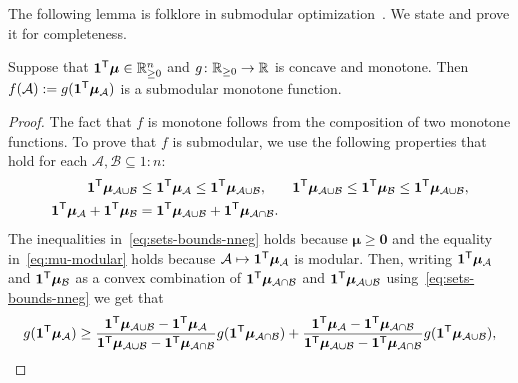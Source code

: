 \documentclass[10pt]{article} %
\renewcommand{\cite}{\citep}
\begin{document}
The following lemma is folklore in submodular optimization~\cite[theorem~4.5.1]{Bilmes18}. We state and prove it for completeness.
\begin{lemma} \label{lem:submodular-concave}
  Suppose that $\bm{1}^{\mathsf{T}}\bm{\mu}\in \mathbb{R}^n_{\ge 0}$ and $g \colon \mathbb{R}_{\ge 0} \to \mathbb{R}$ is concave and monotone. Then $f(\mathcal{A}) := g(\bm{1}^{\mathsf{T}}\bm{\mu}_{\mathcal{A}})$ is a submodular monotone function.
\end{lemma}
\begin{proof}
  The fact that $f$ is monotone follows from the composition of two monotone functions. To prove that $f$ is submodular, we use the following properties that hold for each $\mathcal{A}, \mathcal{B} \subseteq 1{:}n$:
  \begin{align}
    \label{eq:sets-bounds-nneg}
    \bm{1}^{\mathsf{T}}\bm{\mu}_{\mathcal{A} \cup \mathcal{B}}
    &\le \bm{1}^{\mathsf{T}}\bm{\mu}_{\mathcal{A}} \le \bm{1}^{\mathsf{T}}\bm{\mu}_{\mathcal{A} \cup \mathcal{B}},
    &
    \bm{1}^{\mathsf{T}}\bm{\mu}_{\mathcal{A} \cup \mathcal{B}}
    &\le \bm{1}^{\mathsf{T}}\bm{\mu}_{\mathcal{B}} \le \bm{1}^{\mathsf{T}}\bm{\mu}_{\mathcal{A} \cup \mathcal{B}}, \\
    \label{eq:mu-modular}
    \bm{1}^{\mathsf{T}}\bm{\mu}_{\mathcal{A}} + \bm{1}^{\mathsf{T}}\bm{\mu}_{\mathcal{B}}
    &= \bm{1}^{\mathsf{T}}\bm{\mu}_{\mathcal{A} \cup \mathcal{B}} + \bm{1}^{\mathsf{T}}\bm{\mu}_{\mathcal{A} \cap \mathcal{B}}.
  \end{align}
  The inequalities in~\eqref{eq:sets-bounds-nneg} holds because $\bm{\mu} \ge  \bm{0}$ and the equality in~\eqref{eq:mu-modular} holds because $\mathcal{A} \mapsto \bm{1}^{\mathsf{T}}\bm{\mu}_{\mathcal{A}}$ is modular. Then, writing $\bm{1}^{\mathsf{T}}\bm{\mu}_{\mathcal{A}}$ and $\bm{1}^{\mathsf{T}}\bm{\mu}_{\mathcal{B}}$ as a convex combination of $\bm{1}^{\mathsf{T}}\bm{\mu}_{\mathcal{A}\cap \mathcal{B}}$ and $\bm{1}^{\mathsf{T}}\bm{\mu}_{\mathcal{A} \cup \mathcal{B}}$ using~\eqref{eq:sets-bounds-nneg} we get that
  \begin{align}
  \label{eq:ga-bound}
    g(\bm{1}\tr\bm{\mu}_{\mathcal{A}})
    &\ge
      \frac{\bm{1}\tr\bm{\mu}_{\mathcal{A} \cup \mathcal{B}} - \bm{1}\tr\bm{\mu}_{\mathcal{A}}}{\bm{1}\tr\bm{\mu}_{\mathcal{A} \cup \mathcal{B}} - \bm{1}\tr\bm{\mu}_{\mathcal{A} \cap \mathcal{B}}} g(\bm{1}\tr\bm{\mu}_{\mathcal{A} \cap \mathcal{B}}) + 
      \frac{\bm{1}\tr\bm{\mu}_{\mathcal{A}} - \bm{1}\tr\bm{\mu}_{\mathcal{A} \cap \mathcal{B}}}{\bm{1}\tr\bm{\mu}_{\mathcal{A} \cup \mathcal{B}} - \bm{1}\tr\bm{\mu}_{\mathcal{A} \cap \mathcal{B}}} g(\bm{1}\tr\bm{\mu}_{\mathcal{A} \cup \mathcal{B}}), \\
  \label{eq:gb-bound}

\end{align}
\end{proof}
\end{document}
